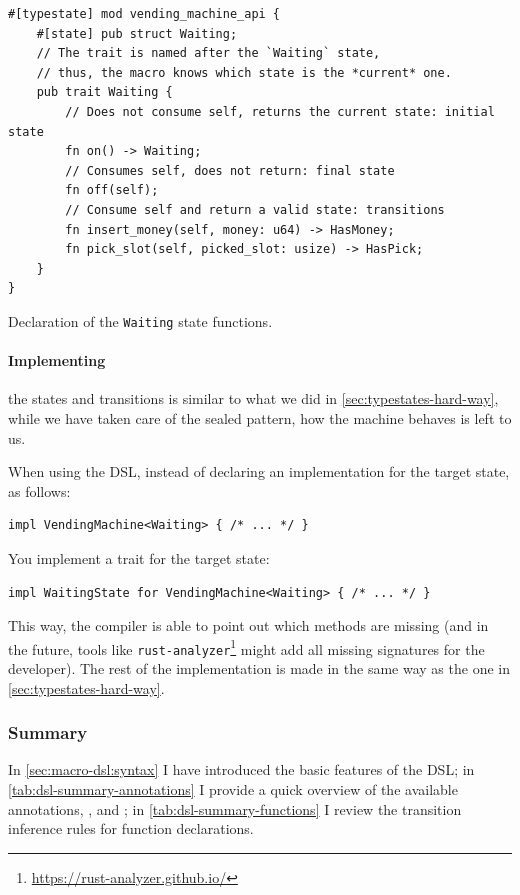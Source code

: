 \begin{listing}
    \begin{verbatim}
#[typestate] mod vending_machine_api {
    #[state] pub struct Waiting;
    // The trait is named after the `Waiting` state,
    // thus, the macro knows which state is the *current* one.
    pub trait Waiting {
        // Does not consume self, returns the current state: initial state
        fn on() -> Waiting;
        // Consumes self, does not return: final state
        fn off(self);
        // Consume self and return a valid state: transitions
        fn insert_money(self, money: u64) -> HasMoney;
        fn pick_slot(self, picked_slot: usize) -> HasPick;
    }
}
    \end{verbatim}
    \caption{Declaration of the \texttt{Waiting} state functions.}
    \label{lst:vending-machine-typestate-module-transitions}
\end{listing}

\paragraph{Implementing} the states and transitions is similar to what we did in \autoref{sec:typestates-hard-way},
while we have taken care of the sealed pattern, how the machine behaves is left to us.

When using the DSL, instead of declaring an implementation for the target state, as follows:
\begin{verbatim}
impl VendingMachine<Waiting> { /* ... */ }
\end{verbatim}

You implement a trait for the target state:
\begin{verbatim}
impl WaitingState for VendingMachine<Waiting> { /* ... */ }
\end{verbatim}

This way, the compiler is able to point out which methods are missing
(and in the future, tools like \texttt{rust-analyzer}\footnote{\url{https://rust-analyzer.github.io/}} might add all missing signatures for the developer).
The rest of the implementation is made in the same way as the one in \autoref{sec:typestates-hard-way}.


\subsubsection{Summary}

In \autoref{sec:macro-dsl:syntax} I have introduced the basic features of the DSL;
in \autoref{tab:dsl-summary-annotations} I provide a quick overview of the available annotations,
,  and ;
in \autoref{tab:dsl-summary-functions} I review the transition inference rules for function declarations.


